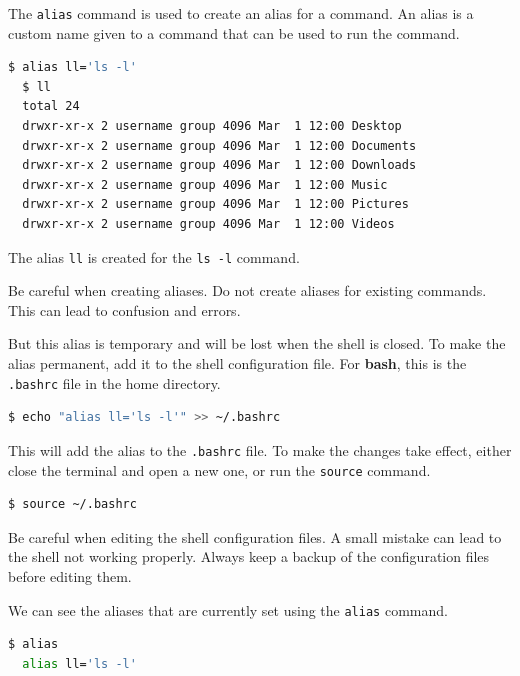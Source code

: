 The \texttt{alias} command is used to create an alias for a command.
An alias is a custom name given to a command that can be used to run the command.

\begin{lstlisting}[language=bash]
  $ alias ll='ls -l'
  $ ll
  total 24
  drwxr-xr-x 2 username group 4096 Mar  1 12:00 Desktop
  drwxr-xr-x 2 username group 4096 Mar  1 12:00 Documents
  drwxr-xr-x 2 username group 4096 Mar  1 12:00 Downloads
  drwxr-xr-x 2 username group 4096 Mar  1 12:00 Music
  drwxr-xr-x 2 username group 4096 Mar  1 12:00 Pictures
  drwxr-xr-x 2 username group 4096 Mar  1 12:00 Videos
\end{lstlisting}

The alias \texttt{ll} is created for the \texttt{ls -l} command.

\begin{warn}
  Be careful when creating aliases.
  Do not create aliases for existing commands.
  This can lead to confusion and errors.
\end{warn}

But this alias is temporary and will be lost when the shell is closed.
To make the alias permanent, add it to the shell configuration file.
For \textbf{bash}, this is the \texttt{.bashrc} file in the home directory.

\begin{lstlisting}[language=bash]
  $ echo "alias ll='ls -l'" >> ~/.bashrc
\end{lstlisting}

This will add the alias to the \texttt{.bashrc} file.
To make the changes take effect, either close the terminal and open a new one, or run the \texttt{source} command.

\begin{lstlisting}[language=bash]
  $ source ~/.bashrc
\end{lstlisting}


\begin{warn}
  Be careful when editing the shell configuration files.
  A small mistake can lead to the shell not working properly.
  Always keep a backup of the configuration files before editing them.
\end{warn}

We can see the aliases that are currently set using the \texttt{alias} command.

\begin{lstlisting}[language=bash]
  $ alias
  alias ll='ls -l'
\end{lstlisting}

